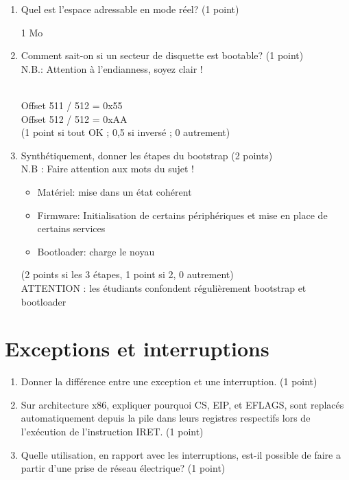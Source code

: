 \begin{enumerate}

\item Quel est l'espace adressable en mode réel? (1 point)

\begin{correction}
1 Mo
\end{correction}


\item Comment sait-on si un secteur de disquette est bootable? (1 point)\\
N.B.: Attention à l'endianness, soyez clair !

\begin{correction}\\
Offset 511 / 512 = 0x55\\
Offset 512 / 512 = 0xAA\\
(1 point si tout OK ; 0,5 si inversé ; 0 autrement)\\
\end{correction}


\item Synthétiquement, donner les étapes du bootstrap (2 points)\\
N.B : Faire attention aux mots du sujet !

\begin{correction}
\begin{itemize}
  \item Matériel: mise dans un état cohérent
  \item Firmware: Initialisation de certains périphériques et mise en place de certains services
  \item Bootloader: charge le noyau
\end{itemize}
(2 points si les 3 étapes, 1 point si 2, 0 autrement)\\
ATTENTION : les étudiants confondent régulièrement bootstrap et bootloader\\
\end{correction}


\end{enumerate}

\section{{Exceptions et interruptions}
         {\hfill{} }}
\begin{enumerate}
  \item Donner la différence entre une exception et une interruption. (1 point)
  \item Sur architecture x86, expliquer pourquoi CS, EIP, et EFLAGS, sont replacés automatiquement depuis la pile dans leurs registres respectifs lors de l'exécution de l'instruction IRET. (1 point)
  \item Quelle utilisation, en rapport avec les interruptions, est-il possible de faire a partir d'une prise de réseau électrique? (1 point)

\end{enumerate}

